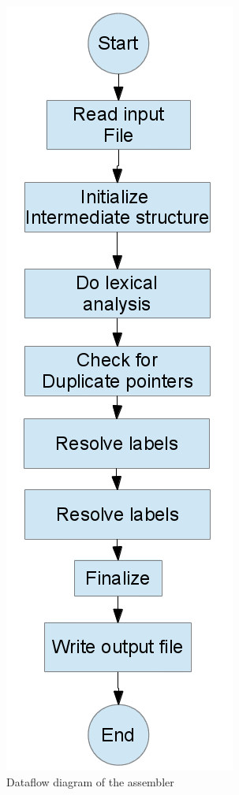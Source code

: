 \documentclass{article}
\begin{document}
\begin{figure}[H]
\begin{centering}
\includegraphics[width=\textwidth,height=\textheight,keepaspectratio]{assembler_flow.png}
\caption{Dataflow diagram of the assembler}
\end{centering}
\end{figure}
\end{document}

